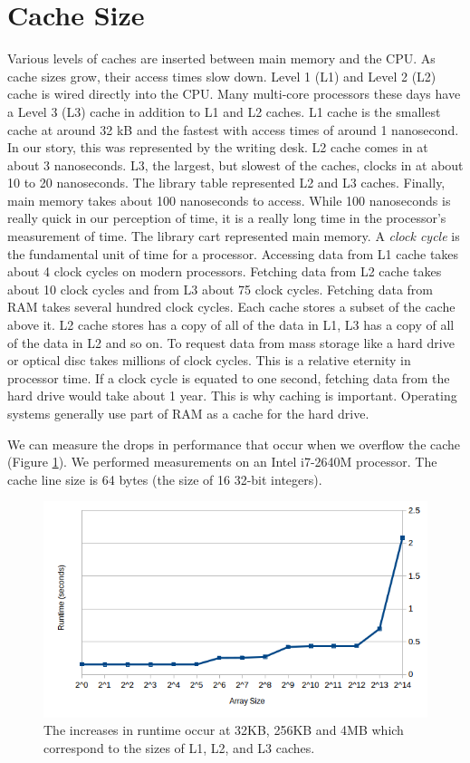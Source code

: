\section*{Cache Size}
Various levels of caches are inserted between main memory and the CPU.
As cache sizes grow, their access times slow down.
Level 1 (L1) and Level 2 (L2) cache is wired directly into the CPU.
Many multi-core processors these days have a Level 3 (L3) cache in addition to L1 and L2 caches.
L1 cache is the smallest cache at around 32 kB and the fastest with access times of around 1 nanosecond.
In our story, this was represented by the writing desk.
L2 cache comes in at about 3 nanoseconds.  L3, the largest, but slowest of the caches, clocks in at about 10 to 20 nanoseconds.
The library table represented L2 and L3 caches.
Finally, main memory takes about 100 nanoseconds to access.  While 100 nanoseconds is really quick in our perception of time, it is a really long time in the processor's measurement of time.
The library cart represented main memory.
A \emph{clock cycle} is the fundamental unit of time for a processor.
Accessing data from L1 cache takes about 4 clock cycles on modern processors. 
Fetching data from L2 cache takes about 10 clock cycles and from L3 about 75 clock cycles.
Fetching data from RAM takes several hundred clock cycles.
Each cache stores a subset of the cache above it.  L2 cache stores has a copy of all of the data in L1, L3 has a copy of all of the data in L2 and so on.
To request data from mass storage like a hard drive or optical disc takes millions of clock cycles.  This is a relative eternity in processor time.
If a clock cycle is equated to one second, fetching data from the hard drive would take about 1 year.
This is why caching is important.  Operating systems generally use part of RAM as a cache for the hard drive.

We can measure the drops in performance that occur when we overflow the cache (Figure \ref{fig:cachesizes}).
We performed measurements on an Intel i7-2640M processor.  The cache line size is 64 bytes (the size of 16 32-bit integers).
\begin{figure}[h]
\centering
\includegraphics[width=\textwidth]{cache_size.png}
\caption{The increases in runtime occur at 32KB, 256KB and 4MB which correspond to the sizes of L1, L2, and L3 caches.}
\label{fig:cachesizes}
\end{figure}


